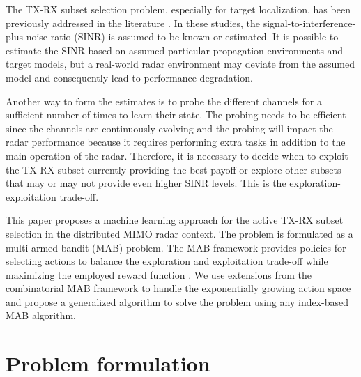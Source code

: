 \documentclass[conference]{IEEEtran}
\begin{document}
The TX-RX subset selection problem, especially for target localization, has been previously addressed in the literature \cite{antenna_subset_selection, selection_and_placement}.
In these studies, the signal-to-interference-plus-noise ratio (SINR) is assumed to be known or estimated.
It is possible to estimate the SINR based on assumed particular propagation environments and target models, but a real-world radar environment may deviate from the assumed model and consequently lead to performance degradation.

Another way to form the estimates is to probe the different channels for a sufficient number of times to learn their state. 
The probing needs to be efficient since the channels are continuously evolving and the probing will impact the radar performance because it requires performing extra tasks in addition to the main operation of the radar.  Therefore, it is necessary to decide when to exploit the TX-RX subset currently providing the best payoff or explore other subsets that may or may not provide even higher SINR levels. 
This is the exploration-exploitation trade-off.

This paper proposes a machine learning approach for the active TX-RX subset selection in the distributed MIMO radar context.
The problem is formulated as a multi-armed bandit (MAB) problem. 
The MAB framework provides policies for selecting actions to balance the exploration and exploitation trade-off while maximizing the employed reward function \cite{lattimorebandit}.
We use extensions from the combinatorial MAB framework to handle the exponentially growing action space and propose a generalized algorithm to solve the problem using any index-based MAB algorithm.



\section{Problem formulation}
\end{document}
